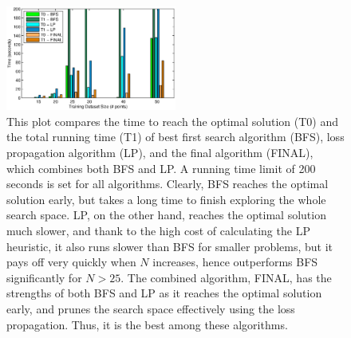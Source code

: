 \begin{figure}[here]
\includegraphics[width=0.50\textwidth]{images/fig33_BnBtimes.eps}
\caption{
This plot compares the time to reach the optimal solution (T0) and the total running time (T1) of best first search algorithm (BFS), loss propagation algorithm (LP), and the final algorithm (FINAL), which combines both BFS and LP. A running time limit of 200 seconds is set for all algorithms. Clearly, BFS reaches the optimal solution early, but takes a long time to finish exploring the whole search space. LP, on the other hand, reaches the optimal solution much slower, and thank to the high cost of  calculating the LP heuristic, it also runs slower than BFS for smaller problems, but it pays off very quickly when $N$ increases, hence outperforms BFS significantly for $N>25$. The combined algorithm, FINAL, has the strengths of both BFS and LP as it reaches the optimal solution early, and  prunes the search space effectively using the loss propagation. Thus, it is the best among these algorithms.}
\label{fig:BnBtimes}
\end{figure} 


